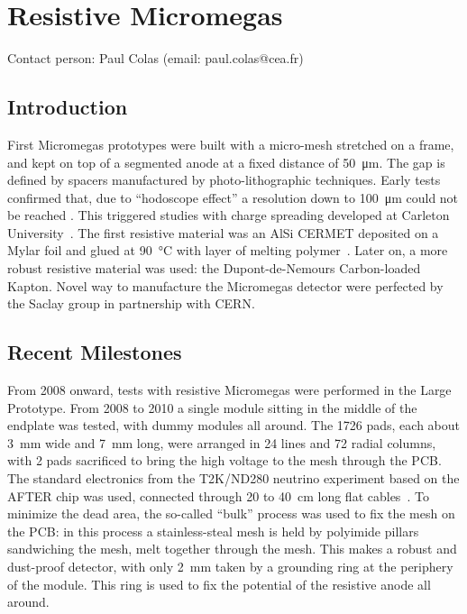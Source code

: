 \section{Resistive Micromegas}\label{chap:TPC_sec:micromegas}
Contact person: Paul Colas (email: paul.colas@cea.fr)\\

\subsection{Introduction}
First Micromegas prototypes were built with a micro-mesh stretched on a frame, and kept on top of
a segmented anode at a fixed distance of \SI{50}{\micro m}. The gap is defined by spacers manufactured
by photo-lithographic techniques. Early tests confirmed that, due to ``hodoscope effect'' a resolution
down to \SI{100}{\micro m} could not be reached \cite{Arogancia:2007pt}. This triggered studies with charge spreading
developed at Carleton University~\cite{Dixit:2003qg}.
The first resistive material was an AlSi CERMET deposited on a Mylar foil and glued at
\SI{90}{\degreeCelsius} with layer of melting polymer~\cite{2007NIMPA.581..254D}. Later on, a more robust resistive material was
used: the Dupont-de-Nemours Carbon-loaded Kapton. Novel way to manufacture the Micromegas detector
were perfected by the Saclay group in partnership with CERN.


\subsection{Recent Milestones}
From 2008 onward, tests with resistive Micromegas were performed in the Large Prototype. From 2008 to 2010
a single module sitting in the middle of the endplate was tested, with dummy modules all around. The 1726 pads, each about \SI{3}{mm} wide
and \SI{7}{mm} long,
were arranged in 24 lines and 72 radial columns, with 2 pads sacrificed to bring the high voltage to the mesh
through the PCB. The standard electronics from the T2K/ND280 neutrino experiment based on the AFTER chip
was used, connected through 20 to \SI{40}{cm} long flat cables~\cite{6418152}.
To minimize the dead area, the so-called ``bulk'' \cite{Giomataris:2004aa} process was used to fix the
mesh on the PCB: in this process a stainless-steal mesh is held by polyimide pillars sandwiching the mesh, melt together
through the mesh. This makes a robust and dust-proof detector, with only \SI{2}
{mm} taken by a grounding ring at the periphery of the module. This ring is used to fix the potential of the resistive anode all around.

